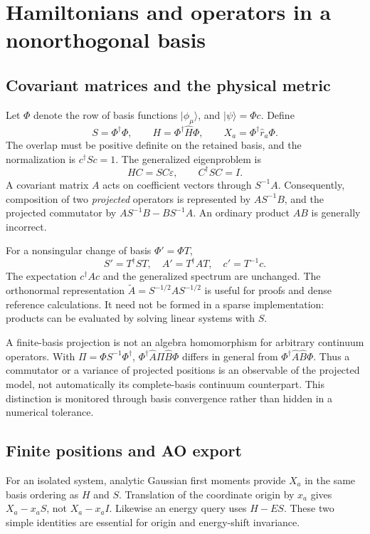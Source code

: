 \section{Hamiltonians and operators in a nonorthogonal basis}
\label{sec:operators}
\subsection{Covariant matrices and the physical metric}
Let $\Phi$ denote the row of basis functions $|\phi_\mu\rangle$, and
$|\psi\rangle=\Phi c$. Define
\begin{equation}
 S=\Phi^\dagger\Phi,\qquad
 H=\Phi^\dagger\widehat H\Phi,\qquad
 X_a=\Phi^\dagger\widehat r_a\Phi .
 \label{eq:ao-data}
\end{equation}
The overlap must be positive definite on the retained basis, and the
normalization is $c^\dagger Sc=1$. The generalized eigenproblem is
\begin{equation}
 HC=SC\varepsilon,\qquad C^\dagger SC=I .
 \label{eq:generalized}
\end{equation}
A covariant matrix $A$ acts on coefficient vectors through $S^{-1}A$.
Consequently, composition of two \emph{projected} operators is represented
by $AS^{-1}B$, and the projected commutator by
$AS^{-1}B-BS^{-1}A$. An ordinary product $AB$ is generally incorrect.

For a nonsingular change of basis $\Phi'=\Phi T$,
\begin{equation}
 S'=T^\dagger ST,\quad A'=T^\dagger AT,\quad c'=T^{-1}c .
 \label{eq:basis-change}
\end{equation}
The expectation $c^\dagger Ac$ and the generalized spectrum are unchanged.
The orthonormal representation
$\widetilde A=S^{-1/2}AS^{-1/2}$ is useful for proofs and dense reference
calculations. It need not be formed in a sparse implementation: products
can be evaluated by solving linear systems with $S$.

A finite-basis projection is not an algebra homomorphism for arbitrary
continuum operators. With $\Pi=\Phi S^{-1}\Phi^\dagger$,
$\Phi^\dagger\widehat A\Pi\widehat B\Phi$ differs in general from
$\Phi^\dagger\widehat A\widehat B\Phi$.
Thus a commutator or a variance of projected positions is an observable
of the projected model, not automatically its complete-basis continuum
counterpart. This distinction is monitored through basis convergence
rather than hidden in a numerical tolerance.

\subsection{Finite positions and AO export}
For an isolated system, analytic Gaussian first moments provide
$X_a$ in the same basis ordering as $H$ and $S$. Translation of the
coordinate origin by $x_a$ gives $X_a-x_aS$, not $X_a-x_aI$.
Likewise an energy query uses $H-ES$. These two simple identities are
essential for origin and energy-shift invariance.

